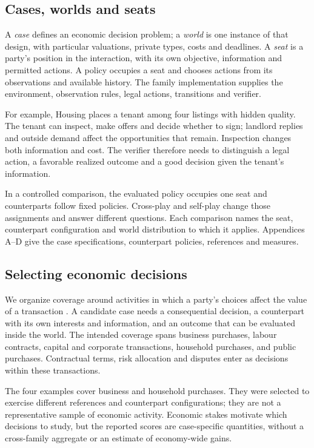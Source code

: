 \subsection{Cases, worlds and seats}
\label{sec:task-formulation}

A \emph{case} defines an economic decision problem; a \emph{world} is
one instance of that design, with particular valuations, private types,
costs and deadlines. A \emph{seat} is a party's position in the
interaction, with its own objective, information and permitted actions.
A policy occupies a seat and chooses actions from its observations and
available history. The family implementation supplies the environment,
observation rules, legal actions, transitions and verifier.

For example, Housing places a tenant among four listings with hidden
quality. The tenant can inspect, make offers and decide whether to sign;
landlord replies and outside demand affect the opportunities that remain.
Inspection changes both information and cost. The verifier therefore
needs to distinguish a legal action, a favorable realized outcome and a
good decision given the tenant's information.

In a controlled comparison, the evaluated policy occupies one seat and
counterparts follow fixed policies. Cross-play and self-play change those
assignments and answer different questions. Each comparison names the
seat, counterpart configuration and world distribution to which it
applies. Appendices A--D give the case specifications, counterpart
policies, references and measures.

\subsection{Selecting economic decisions}

We organize coverage around activities in which a party's choices affect
the value of a transaction \citep{li2026activities}. A candidate case
needs a consequential decision, a counterpart with its own interests and
information, and an outcome that can be evaluated inside the world.
The intended coverage spans business purchases, labour contracts, capital
and corporate transactions, household purchases, and public purchases.
Contractual terms, risk allocation and disputes enter as decisions within
these transactions.

The four examples cover business and household purchases. They were
selected to exercise different references and counterpart configurations;
they are not a representative sample of economic activity. Economic
stakes motivate which decisions to study, but the reported scores are
case-specific quantities, without a cross-family aggregate or an estimate
of economy-wide gains.

